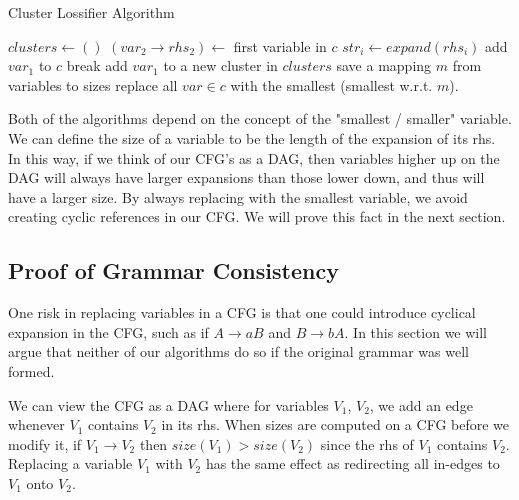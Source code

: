 \documentclass[11pt]{article}
\begin{document}
\begin{algorithm}[h]
\caption{Cluster Lossifier Algorithm}
\label{cluster_alg}
\begin{algorithmic}[1]
 
    \State $clusters \gets ()$
        \State $(var_2 \rightarrow rhs_2) \gets $ first variable in $c$
        \State $str_{i} \gets expand(rhs_i)$
          \State add $var_1$ to $c$
          \State break
        \EndIf
      \EndFor
        \State add $var_1$ to a new cluster in $clusters$
      \EndIf
    \EndFor
    \State save a mapping $m$ from variables to sizes
      \State replace all $var \in c$ with the smallest (smallest w.r.t. $m$).
    \EndFor
  \EndWhile
\EndProcedure
\end{algorithmic}
\end{algorithm}

Both of the algorithms depend on the concept of the "smallest / smaller"
variable. We can define the size of a variable to be the length of the
expansion of its rhs. In this way, if we think of our CFG's as a DAG, then
variables higher up on the DAG will always have larger expansions than those
lower down, and thus will have a larger size. By always replacing with the
smallest variable, we avoid creating cyclic references in our CFG.  We will
prove this fact in the next section.

\subsection{Proof of Grammar Consistency}

One risk in replacing variables in a CFG is that one could introduce cyclical
expansion in the CFG, such as if $A\rightarrow aB$ and $B\rightarrow bA$. In
this section we will argue that neither of our algorithms do so if the original
grammar was well formed.

We can view the CFG as a DAG where for variables $V_1$, $V_2$, we add an edge
whenever $V_1$ contains $V_2$ in its rhs. When sizes are computed on a CFG
before we modify it, if $V_1 \rightarrow V_2$ then $size(V_1) > size(V_2)$ since
the rhs of $V_1$ contains $V_2$.
Replacing a variable $V_1$ with $V_2$ has the same effect as redirecting all
in-edges to $V_1$ onto $V_2$.
\end{document}
